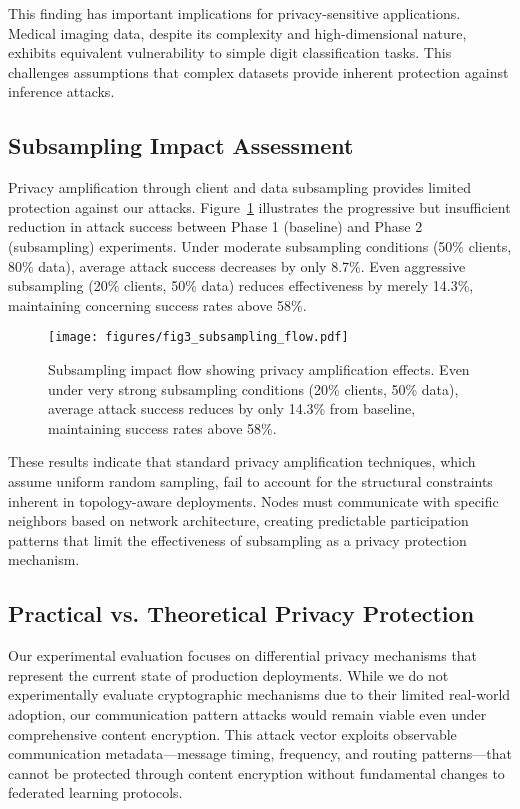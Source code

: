 This finding has important implications for privacy-sensitive applications. Medical imaging data, despite its complexity and high-dimensional nature, exhibits equivalent vulnerability to simple digit classification tasks. This challenges assumptions that complex datasets provide inherent protection against inference attacks.

\subsection{Subsampling Impact Assessment}

Privacy amplification through client and data subsampling provides limited protection against our attacks. Figure~\ref{fig:subsampling_flow} illustrates the progressive but insufficient reduction in attack success between Phase 1 (baseline) and Phase 2 (subsampling) experiments. Under moderate subsampling conditions (50\% clients, 80\% data), average attack success decreases by only 8.7\%. Even aggressive subsampling (20\% clients, 50\% data) reduces effectiveness by merely 14.3\%, maintaining concerning success rates above 58\%.

\begin{figure}[!t]
\centering
\texttt{[image: figures/fig3\_subsampling\_flow.pdf]}
\caption{Subsampling impact flow showing privacy amplification effects. Even under very strong subsampling conditions (20\% clients, 50\% data), average attack success reduces by only 14.3\% from baseline, maintaining success rates above 58\%.}
\label{fig:subsampling_flow}
\end{figure}

These results indicate that standard privacy amplification techniques, which assume uniform random sampling, fail to account for the structural constraints inherent in topology-aware deployments. Nodes must communicate with specific neighbors based on network architecture, creating predictable participation patterns that limit the effectiveness of subsampling as a privacy protection mechanism.

\subsection{Practical vs. Theoretical Privacy Protection}

Our experimental evaluation focuses on differential privacy mechanisms that represent the current state of production deployments. While we do not experimentally evaluate cryptographic mechanisms due to their limited real-world adoption, our communication pattern attacks would remain viable even under comprehensive content encryption. This attack vector exploits observable communication metadata—message timing, frequency, and routing patterns—that cannot be protected through content encryption without fundamental changes to federated learning protocols.

